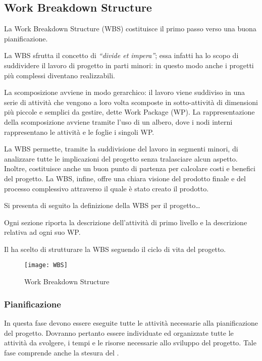 \subsection{Work Breakdown Structure}

La Work Breakdown Structure (WBS) costituisce il primo passo verso una buona pianificazione.

La WBS sfrutta il concetto di \textit{``divide et impera''}; essa infatti ha lo scopo di suddividere il lavoro di progetto in parti minori: in questo modo anche i progetti più complessi diventano realizzabili.

La scomposizione avviene in modo gerarchico: il lavoro viene suddiviso in una serie di attività che vengono a loro volta scomposte in sotto-attività di dimensioni più piccole e semplici da gestire, dette Work Package (WP).
La rappresentazione della scomposizione avviene tramite l'uso di un albero, dove i nodi interni rappresentano le attività e le foglie i singoli WP\@.

La WBS permette, tramite la suddivisione del lavoro in segmenti minori, di analizzare tutte le implicazioni del progetto senza tralasciare alcun aspetto. Inoltre, costituisce anche un buon punto di partenza per calcolare costi e benefici del progetto.
La WBS, infine, offre una chiara visione del prodotto finale e del processo complessivo attraverso il quale è stato creato il prodotto.

Si presenta di seguito la definizione della WBS per il progetto\ldots%

Ogni sezione riporta la descrizione dell'attività di primo livello e la descrizione relativa ad ogni suo WP. 

Il  ha scelto di strutturare la WBS seguendo il ciclo di vita del progetto.

\begin{figure}[!h]
  \centering
  \texttt{[image: WBS]}
  \caption{Work Breakdown Structure}
\end{figure}

\subsubsection{Pianificazione}
In questa fase devono essere eseguite tutte le attività necessarie alla pianificazione del progetto.
Dovranno pertanto essere individuate ed organizzate tutte le attività da svolgere, i tempi e le risorse necessarie allo sviluppo del progetto. Tale fase comprende anche la stesura del .
		
